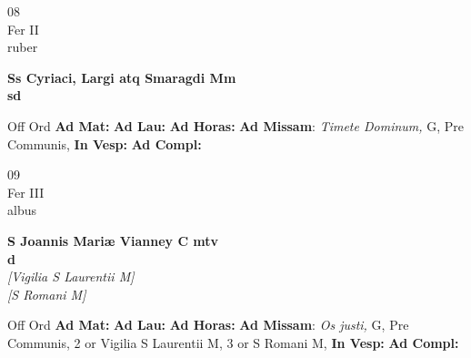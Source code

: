 \documentclass[10pt, openany]{book}
\begin{document}
        \begin{center}
            \begin{minipage}{3.5in}
                \vspace{2em}
                \begin{minipage}{0.5in}
                    {\Huge 08} \\
                    {\normalsize Fer II} \\
                    {\normalsize ruber}
                \end{minipage}
                \begin{minipage}{3.0in}
                    \textbf{ \large Ss Cyriaci, Largi atq Smaragdi Mm \\
                    \textnormal{\normalsize sd}} \\ 
                \end{minipage}
                \begin{justify}Off Ord
                    \textbf{Ad Mat: }
                    \textbf{Ad Lau: }
                    \textbf{Ad Horas: }\textbf{Ad Missam}: \textit{Timete Dominum,} G, Pre Communis,  
                    \textbf{In Vesp: }
                    \textbf{Ad Compl: }
                \end{justify}
            \end{minipage}
        \end{center}
    
        \begin{center}
            \begin{minipage}{3.5in}
                \vspace{2em}
                \begin{minipage}{0.5in}
                    {\Huge 09} \\
                    {\normalsize Fer III} \\
                    {\normalsize albus}
                \end{minipage}
                \begin{minipage}{3.0in}
                    \textbf{ \large S Joannis Mariæ Vianney C mtv \\
                    \textnormal{\normalsize d}} \\ \textit{[Vigilia S Laurentii M]} \\ \textit{[S Romani M]} \\ 
                \end{minipage}
                \begin{justify}Off Ord
                    \textbf{Ad Mat: }
                    \textbf{Ad Lau: }
                    \textbf{Ad Horas: }\textbf{Ad Missam}: \textit{Os justi,} G, Pre Communis, 2 or Vigilia S Laurentii M, 3 or S Romani M,  
                    \textbf{In Vesp: }
                    \textbf{Ad Compl: }
                \end{justify}
            \end{minipage}
        \end{center}
    
\end{document}
